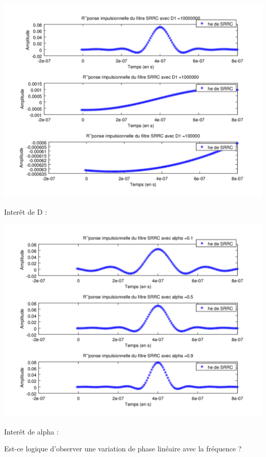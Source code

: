 \documentclass{acm_proc_article-sp}
\begin{document}
\begin{center}
\includegraphics[scale=0.45]{SRRC_varD_3.png}
\end{center}

Interêt de D : 

\begin{center}
\includegraphics[scale=0.45]{SRRC_varAlpha_3.png}
\end{center}

Interêt de alpha :

Est-ce logique d'observer une variation de phase linéaire avec la fréquence ?
\end{document}
